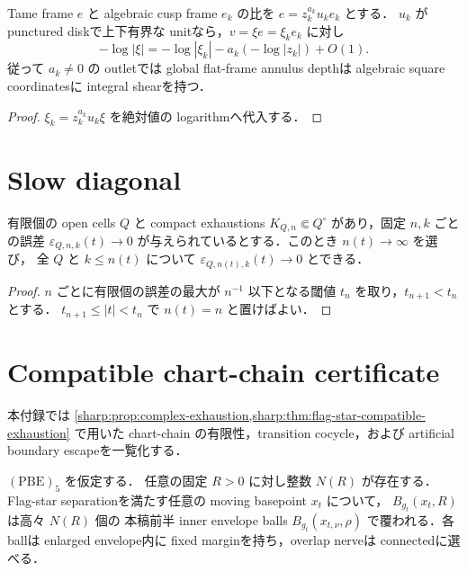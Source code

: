 \documentclass[a4paper,11pt]{ltjsarticle}
\numberwithin{equation}{section}
\theoremstyle{plain}
\theoremstyle{definition}
\theoremstyle{remark}
\newcommand{\eps}{\varepsilon}\newcommand{\dd}{\,\mathrm d}\newcommand{\ddc}{\sqrt{-1}\,\partial\bar\partial}
\begin{document}
\begin{lemma}\label{sharp:lem:orders-shear}
Tame frame $e$ と algebraic cusp frame $e_k$ の比を $e=z_k^{a_k}u_ke_k$ とする．
$u_k$ が punctured diskで上下有界な unitなら，$v=\xi e=\xi_k e_k$ に対し
\[
 -\log|\xi|=-\log|\xi_k|-a_k(-\log|z_k|)+O(1).
\]
従って $a_k\ne0$ の outletでは global flat-frame annulus depthは algebraic square coordinatesに integral shearを持つ．
\end{lemma}

\begin{proof}
$\xi_k=z_k^{a_k}u_k\xi$ を絶対値の logarithmへ代入する．
\end{proof}

\section{Slow diagonal}\label{sharp:app:diagonal}

\begin{lemma}\label{sharp:lem:slow-diagonal}
有限個の open cells $Q$ と compact exhaustions $K_{Q,n}\Subset Q^\circ$ があり，固定 $n,k$ ごとの誤差
$\eps_{Q,n,k}(t)\to0$ が与えられているとする．このとき $n(t)\to\infty$ を選び，
全 $Q$ と $k\le n(t)$ について $\eps_{Q,n(t),k}(t)\to0$ とできる．
\end{lemma}

\begin{proof}
$n$ ごとに有限個の誤差の最大が $n^{-1}$ 以下となる閾値 $t_n$ を取り，$t_{n+1}<t_n$ とする．
$t_{n+1}\le|t|<t_n$ で $n(t)=n$ と置けばよい．
\end{proof}

\section{Compatible chart-chain certificate}\label{sharp:app:chart-chain-certificate}

本付録では \cref{sharp:prop:complex-exhaustion,sharp:thm:flag-star-compatible-exhaustion} で用いた chart-chain の有限性，transition cocycle，および artificial boundary escapeを一覧化する．

\begin{lemma}\label{sharp:lem:fixed-ball-chart-count}
$\mathrm{(PBE)}_5$ を仮定する．
任意の固定 $R>0$ に対し整数 $N(R)$ が存在する．Flag-star separationを満たす任意の moving basepoint $x_t$ について，
$B_{g_t}(x_t,R)$ は高々 $N(R)$ 個の 本稿前半 inner envelope balls $B_{g_t}(x_{t,\nu},\rho)$ で覆われる．各 ballは enlarged envelope内に fixed marginを持ち，overlap nerveは connectedに選べる．
\end{lemma}
\end{document}
